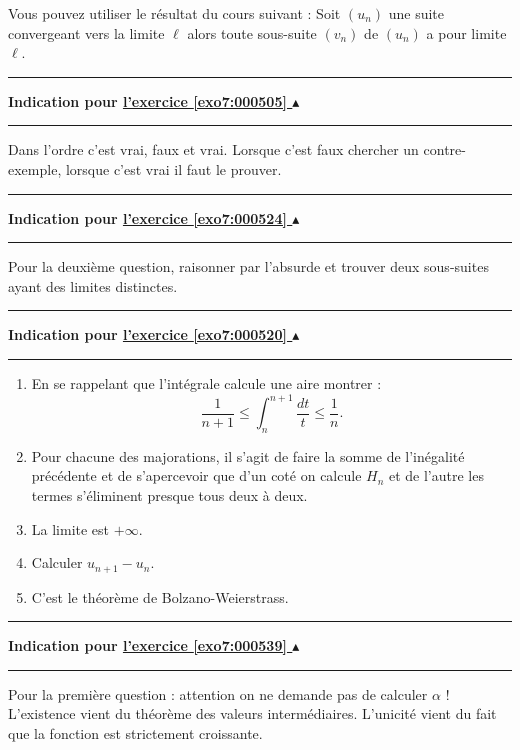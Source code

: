\documentclass[11pt,a4paper]{article}
\newcounter{exo}
\newcommand{\indication}[1]{\hypertarget{ind7:#1}{}\label{ind7:#1}{\bf Indication pour \hyperlink{exo7:#1}{l'exercice \ref{exo7:#1} $\blacktriangle$}}\vspace{1mm}\hrule\vspace{1mm}}
\newcommand{\finindication}{\vspace{1mm}\hrule\vspace*{7mm}}
\begin{document}
Vous pouvez utiliser le r\'esultat du cours suivant :
Soit $(u_n)$ une suite convergeant  vers la limite $\ell$ alors toute sous-suite $(v_n)$ de $(u_n)$ a pour limite $\ell$.
\finindication
\indication{000505}
Dans l'ordre c'est vrai, faux et vrai. Lorsque c'est faux chercher un contre-exemple, lorsque c'est vrai il faut le prouver.
\finindication
\indication{000524}
Pour la deuxi\`eme question, raisonner par l'absurde et trouver deux sous-suites ayant des limites distinctes.
\finindication
\indication{000520}
\begin{enumerate}
\item En se rappelant que l'int\'egrale calcule une aire montrer : 
$$\frac{1}{n+1} \leqslant \int_n^{n+1} \frac{dt}{t} \leqslant \frac 1n.$$
\item Pour chacune des majorations, il s'agit de faire la somme de l'in\'egalit\'e pr\'ec\'edente et de s'apercevoir que d'un cot\'e on calcule $H_n$ et de l'autre les termes s'\'eliminent presque tous deux \`a deux.
\item La limite est $+\infty$.
\item Calculer $u_{n+1}-u_n$.
\item C'est le th\'eor\`eme de Bolzano-Weierstrass.
\end{enumerate}
\finindication
\indication{000539}
Pour la premi\`ere question : attention on ne demande pas de calculer $\alpha$ !
L'existence vient du th\'eor\`eme des valeurs interm\'ediaires. L'unicit\'e vient du fait que la fonction est strictement croissante.
  
\end{document}
